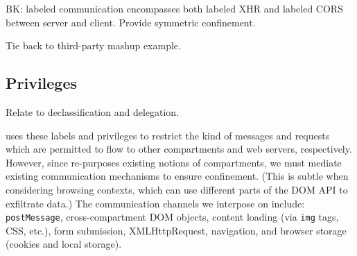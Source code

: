 BK: labeled communication encompasses both labeled XHR and labeled
CORS between server and client. Provide symmetric confinement.

Tie back to third-party mashup example.

\subsection{Privileges}
\label{sec:system:privileges}
Relate to declassification and delegation.

\break


 
\sys{} uses these labels and privileges to restrict the
kind of messages and requests which are permitted to flow to other
compartments and web servers, respectively.
%
However, since \sys{} re-purposes existing notions of compartments, we
must mediate existing communication mechanisms to ensure confinement.
%
(This is subtle when considering browsing contexts, which can use
different parts of the DOM API to exfiltrate data.)
%
The communication channels we interpose on include:
%
{\tt postMessage},
cross-compartment DOM objects,
content loading (via {\tt img} tags, CSS, etc.),
form submission,
XMLHttpRequest,
navigation, and
browser storage (cookies and local storage).

